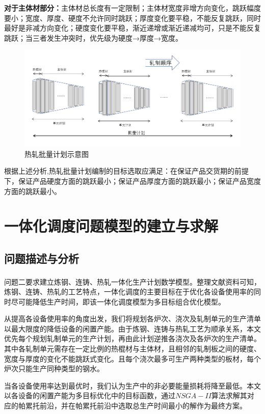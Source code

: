 \documentclass{whutmod}
\newcommand{\upcite}[1]{\textsuperscript{\cite{#1}}}
\begin{document}
	\textbf{ 对于主体材部分：}主体材总长度有一定限制；主体材宽度非增方向变化，跳跃幅度要小；宽度、厚度、硬度不允许同时跳跃；厚度变化要平稳，不能反复跳跃，同时最好是非减方向变化；硬度变化要平稳，渐近递增或渐近递减均可，只是不能反复跳跃；当三者发生冲突时，优先级为硬度→厚度→宽度。
	\begin{figure}[H]
		\centering
		\includegraphics[width=1\textwidth]{figures/asdad.png}
		\caption{热轧批量计划示意图}\label{11sssss11}
	\end{figure}
    

    根据上述分析,热轧批量计划编制的目标选取应满足：在保证产品交货期的前提下，保证产品硬度方面的跳跃最小；保证产品厚度方面的跳跃最小；保证产品宽度方面的跳跃最小。

	
	
	
	\section{一体化调度问题模型的建立与求解}
		\subsection{问题描述与分析}
			问题二要求建立炼钢、连铸、热轧一体化生产计划数学模型。整理文献资料可知\upcite{1,2,3}，炼钢、连铸、热轧的工艺特点，一体化调度的主要目标在于优化各设备使用率的同时尽可能降低生产时间，即该一体化调度模型为多目标组合优化模型。
			
			从提高各设备使用率的角度出发，我们将规划各炉次、浇次及轧制单元的生产清单以最大限度的降低设备的闲置产能。由于炼钢、连铸与热轧工艺为顺承关系，本文优先每个规划轧制单元的生产计划，再由此计划逆推各浇次及各炉次的生产清单。其中各轧制单元需存在一定比例的热棍材与主体材，且相邻的轧制板之间的硬度、宽度与厚度的变化不能跳跃式变化。且每个浇次最多可生产两种类型的板材，每个炉次只能生产同种类型的钢水。
			

            当各设备使用率达到最优时，我们认为生产中的非必要能量损耗将降至最低。本文以各设备的闲置产能为多目标优化中的目标函数，通过$NSGA-II$算法求解其对应的帕累托前沿，并在帕累托前沿中选取总生产时间最小的解作为最终方案。
\end{document}
